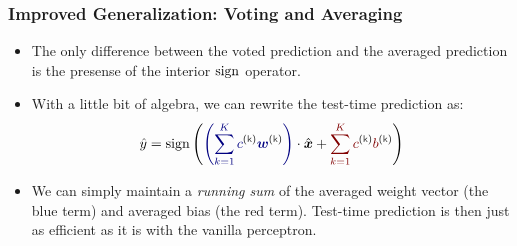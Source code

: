 \documentclass[trans]{beamer}
\begin{document}
\begin{frame}
  \frametitle{Improved Generalization: Voting and Averaging}
\begin{itemize}
\item 
The only difference between the voted prediction and the averaged prediction is the presense of the interior $\textrm{sign}$
operator.
\item  With a little bit of algebra, we can rewrite the test-time
prediction as:
\begin{equation}
  \hat y = \sign \left(
    \dotp{\textcolor{darkblue}{\left(
        \sum_{k=1}^K c\kth \vw\kth 
        \right)}}{\hat\vx} +
      \textcolor{darkred}{\sum_{k=1}^K c\kth b\kth}
      \right)
\end{equation}
\item We can simply
maintain a \emph{running sum} of the averaged weight vector (the blue
term) and averaged bias (the red term).  Test-time prediction is then
just as efficient as it is with the vanilla perceptron.
\end{itemize}
\end{frame}
\end{document}
